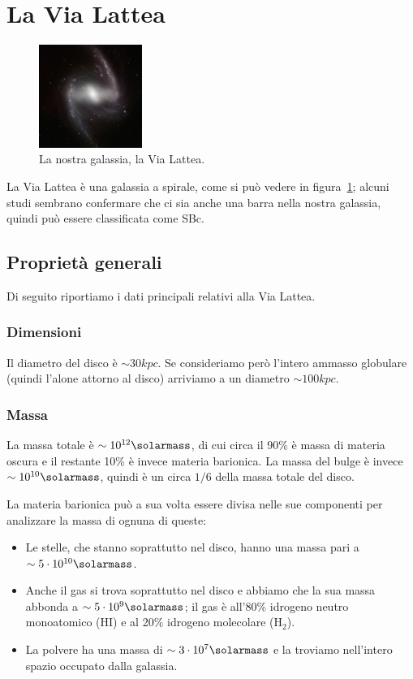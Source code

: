 \section{La Via Lattea}\label{sec:via-lattea}
\begin{figure}
    \centering
    \includegraphics[width = 0.3\textwidth]{immagini/via-lattea.png}
    \caption{La nostra galassia, la Via Lattea.}
    \label{fig:via-lattea}
\end{figure}

La Via Lattea è una galassia a spirale, come si può vedere in figura~\ref{fig:via-lattea}; alcuni studi sembrano confermare che ci sia anche una barra nella nostra galassia, quindi può essere classificata come SBc. 

\subsection{Proprietà generali}
Di seguito riportiamo i dati principali relativi alla Via Lattea.

\subsubsection{Dimensioni}
Il diametro del disco è $\sim 30 kpc$. Se consideriamo però l'intero ammasso globulare (quindi l'alone attorno al disco) arriviamo a un diametro $\sim 100 kpc$.

\subsubsection{Massa}
La massa totale è $\sim 10^{12} \si{\solarmass}$, di cui circa il 90\% è massa di materia oscura e il restante 10\% è invece materia barionica. 
La massa del bulge è invece $\sim 10^{10} \si{\solarmass}$, quindi è un circa $1/6$ della massa totale del disco.

La materia barionica può a sua volta essere divisa nelle sue componenti per analizzare la massa di ognuna di queste:
\begin{itemize}
    \item Le stelle, che stanno soprattutto nel disco, hanno una massa pari a $\sim 5 \cdot 10^{10} \si{\solarmass}$.
    \item Anche il gas si trova soprattutto nel disco e abbiamo che la sua massa abbonda a $\sim 5 \cdot 10^9 \si{\solarmass}$; il gas è all'80\% idrogeno neutro monoatomico (HI) e al 20\% idrogeno molecolare (H$_{2}$). 
    \item La polvere ha una massa di $\sim 3 \cdot 10^7 \si{\solarmass}$ e la troviamo nell'intero spazio occupato dalla galassia.
\end{itemize}

